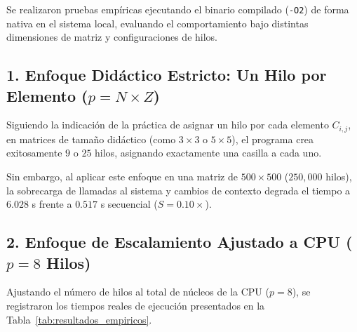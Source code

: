 \documentclass[runningheads]{llncs}
\begin{document}
Se realizaron pruebas empíricas ejecutando el binario compilado (\texttt{-O2}) de forma nativa en el sistema local, evaluando el comportamiento bajo distintas dimensiones de matriz y configuraciones de hilos.

\subsection{1. Enfoque Didáctico Estricto: Un Hilo por Elemento ($p = N \times Z$)}
Siguiendo la indicación de la práctica de asignar un hilo por cada elemento $C_{i,j}$, en matrices de tamaño didáctico (como $3 \times 3$ o $5 \times 5$), el programa crea exitosamente $9$ o $25$ hilos, asignando exactamente una casilla a cada uno. 

Sin embargo, al aplicar este enfoque en una matriz de $500 \times 500$ ($250,000$ hilos), la sobrecarga de llamadas al sistema y cambios de contexto degrada el tiempo a $6.028$ s frente a $0.517$ s secuencial ($S = 0.10\times$).

\subsection{2. Enfoque de Escalamiento Ajustado a CPU ($p = 8$ Hilos)}
Ajustando el número de hilos al total de núcleos de la CPU ($p = 8$), se registraron los tiempos reales de ejecución presentados en la Tabla~\ref{tab:resultados_empiricos}.
\end{document}
